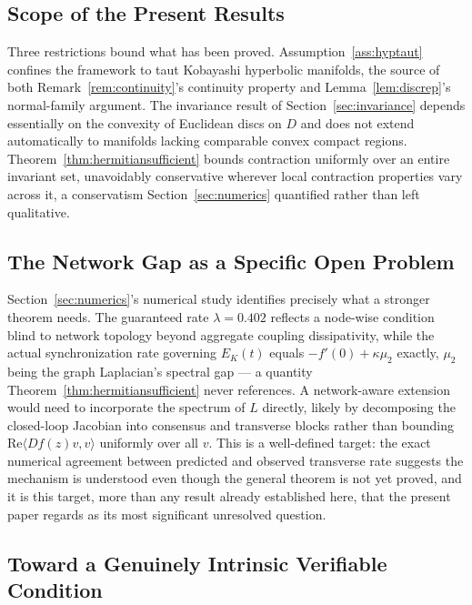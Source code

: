 \documentclass[preprint,12pt,authoryear]{elsarticle}
\begin{document}
\subsection{Scope of the Present Results}

Three restrictions bound what has been proved. Assumption~\ref{ass:hyptaut} confines the framework to taut Kobayashi hyperbolic manifolds, the source of both Remark~\ref{rem:continuity}'s continuity property and Lemma~\ref{lem:discrep}'s normal-family argument. The invariance result of Section~\ref{sec:invariance} depends essentially on the convexity of Euclidean discs on $D$ and does not extend automatically to manifolds lacking comparable convex compact regions. Theorem~\ref{thm:hermitiansufficient} bounds contraction uniformly over an entire invariant set, unavoidably conservative wherever local contraction properties vary across it, a conservatism Section~\ref{sec:numerics} quantified rather than left qualitative.

\subsection{The Network Gap as a Specific Open Problem}

Section~\ref{sec:numerics}'s numerical study identifies precisely what a stronger theorem needs. The guaranteed rate $\lambda=0.402$ reflects a node-wise condition blind to network topology beyond aggregate coupling dissipativity, while the actual synchronization rate governing $E_K(t)$ equals $-f'(0)+\kappa\mu_2$ exactly, $\mu_2$ being the graph Laplacian's spectral gap --- a quantity Theorem~\ref{thm:hermitiansufficient} never references. A network-aware extension would need to incorporate the spectrum of $L$ directly, likely by decomposing the closed-loop Jacobian into consensus and transverse blocks rather than bounding $\mathrm{Re}\langle Df(z)v,v\rangle$ uniformly over all $v$. This is a well-defined target: the exact numerical agreement between predicted and observed transverse rate suggests the mechanism is understood even though the general theorem is not yet proved, and it is this target, more than any result already established here, that the present paper regards as its most significant unresolved question.

\subsection{Toward a Genuinely Intrinsic Verifiable Condition}
\end{document}
